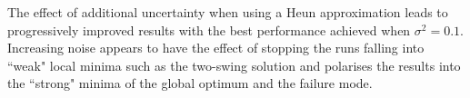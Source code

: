 The effect of additional uncertainty when using a Heun approximation leads to progressively improved results with the best performance achieved when $\sigma^2=0.1$. Increasing noise appears to have the effect of stopping the runs falling into ``weak" local minima such as the two-swing solution and polarises the results into the ``strong" minima of the global optimum and the failure mode.



\begin{figure}
\centering \small
{}
\end{figure}

